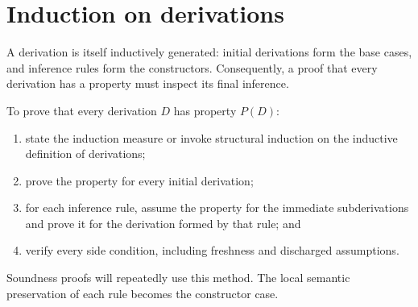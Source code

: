 \section{Induction on derivations}
\label{sec:strings-04}

A derivation is itself inductively generated: initial derivations form the
base cases, and inference rules form the constructors.  Consequently, a proof
that every derivation has a property must inspect its final inference.

\begin{method}
To prove that every derivation \(D\) has property \(P(D)\):
\begin{enumerate}
  \item state the induction measure or invoke structural induction on the
        inductive definition of derivations;
  \item prove the property for every initial derivation;
  \item for each inference rule, assume the property for the immediate
        subderivations and prove it for the derivation formed by that rule; and
  \item verify every side condition, including freshness and discharged
        assumptions.
\end{enumerate}
\end{method}

Soundness proofs will repeatedly use this method.  The local semantic
preservation of each rule becomes the constructor case.

